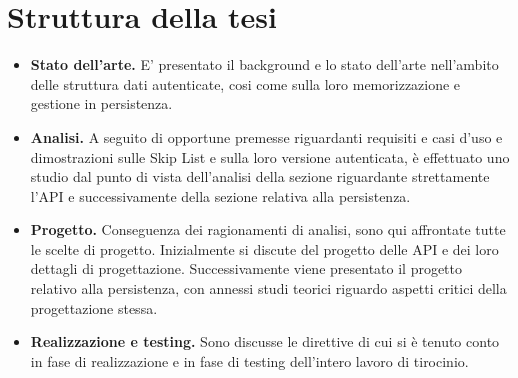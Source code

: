 \section{Struttura della tesi}
	

		\begin{itemize}
			\item \textbf{Stato dell'arte.} E' presentato il background e lo stato dell'arte nell'ambito delle struttura dati autenticate, cosi come sulla loro memorizzazione e gestione in persistenza.
			\item \textbf{Analisi.} A seguito di opportune premesse riguardanti requisiti e casi d'uso e dimostrazioni sulle Skip List e sulla loro versione autenticata, è effettuato uno studio dal punto di vista dell'analisi della sezione riguardante strettamente l'API e successivamente della sezione relativa alla persistenza.
			\item \textbf{Progetto.} Conseguenza dei ragionamenti di analisi, sono qui affrontate tutte le scelte di progetto. Inizialmente si discute del progetto delle API e dei loro dettagli di progettazione. Successivamente viene presentato il progetto relativo alla persistenza, con annessi studi teorici riguardo aspetti critici della progettazione stessa.
			\item \textbf{Realizzazione e testing.} Sono discusse le direttive di cui si è tenuto conto in fase di realizzazione e in fase di testing dell'intero lavoro di tirocinio.			
		\end{itemize}